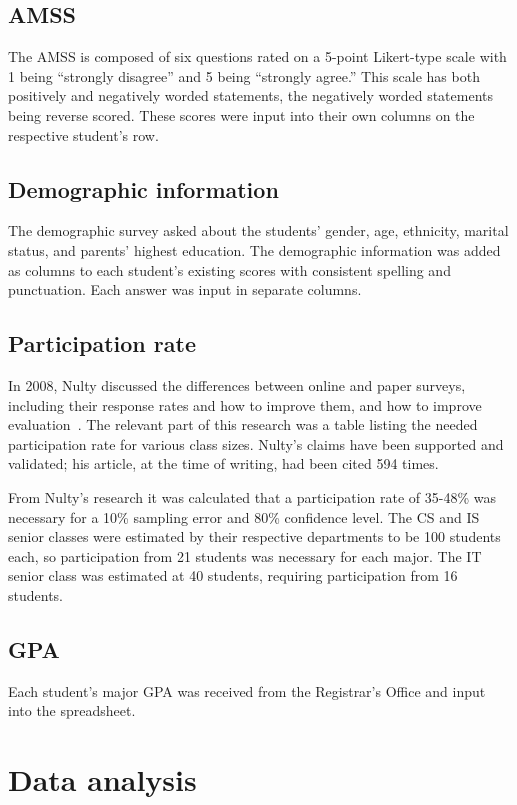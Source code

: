\subsection{AMSS}
The AMSS is composed of six questions rated on a 5-point Likert-type scale with 1 being ``strongly disagree'' and 5 being ``strongly agree.'' This scale has both positively and negatively worded statements, the negatively worded statements being reverse scored. These scores were input into their own columns on the respective student's row.

\subsection{Demographic information}
The demographic survey asked about the students' gender, age, ethnicity, marital status, and parents' highest education. The demographic information was added as columns to each student's existing scores with consistent spelling and punctuation. Each answer was input in separate columns.

\subsection{Participation rate}
In 2008, Nulty discussed the differences between online and paper surveys, including their response rates and how to improve them, and how to improve evaluation~\citep{nulty2008}. The relevant part of this research was a table listing the needed participation rate for various class sizes. Nulty's claims have been supported and validated; his article, at the time of writing, had been cited 594 times.

From Nulty's research it was calculated that a participation rate of 35-48\% was necessary for a 10\% sampling error and 80\% confidence level. The CS and IS senior classes were estimated by their respective departments to be 100 students each, so participation from 21 students was necessary for each major. The IT senior class was estimated at 40 students, requiring participation from 16 students.

\subsection{GPA}
Each student's major GPA was received from the Registrar's Office and input into the spreadsheet.

\section{Data analysis}
